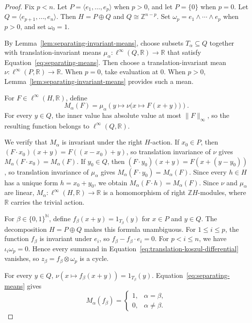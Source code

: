 \documentclass[pdflatex,sn-mathphys-num]{sn-jnl}%
\theoremstyle{plain}
\theoremstyle{remark}
\theoremstyle{definition}
\numberwithin{equation}{section}
\begin{document}
\begin{proof}
Fix \( p<n \). Let \( P=\langle e_1,\ldots,e_p\rangle \) when \( p>0 \), and let \( P=\{0\} \) when \( p=0 \). Let \( Q=\langle e_{p+1},\ldots,e_n\rangle \). Then \( H=P\oplus Q \) and \( Q\cong\mathbb Z^{n-p} \). Set \( \omega_p=e_1\wedge\cdots\wedge e_p \) when \( p>0 \), and set \( \omega_0=1 \).

By Lemma~\ref{lem:separating-invariant-means}, choose subsets \( T_\alpha\subseteq Q \) together with translation-invariant means \( \mu_\alpha\colon\ell^\infty(Q,\mathbb R)\to\mathbb R \) that satisfy Equation~\eqref{eq:separating-means}. Then choose a translation-invariant mean \( \nu\colon\ell^\infty(P,\mathbb R)\to\mathbb R \). When \( p=0 \), take evaluation at \( 0 \). When \( p>0 \), Lemma~\ref{lem:separating-invariant-means} provides such a mean.

For \( F\in\ell^\infty(H,\mathbb R) \), define
\[
M_\alpha(F)
=
\mu_\alpha\left(
y
\longmapsto
\nu\bigl(
x\longmapsto F(x+y)
\bigr)
\right).
\]
For every \( y\in Q \), the inner value has absolute value at most \( \|F\|_\infty \), so the resulting function belongs to \( \ell^\infty(Q,\mathbb R) \).

We verify that \( M_\alpha \) is invariant under the right \( H \)-action. If \( x_0\in P \), then \( (F\cdot x_0)(x+y)=F((x-x_0)+y) \), so translation invariance of \( \nu \) gives \( M_\alpha(F\cdot x_0)=M_\alpha(F) \). If \( y_0\in Q \), then \( (F\cdot y_0)(x+y)=F(x+(y-y_0)) \), so translation invariance of \( \mu_\alpha \) gives \( M_\alpha(F\cdot y_0)=M_\alpha(F) \). Since every \( h\in H \) has a unique form \( h=x_0+y_0 \), we obtain \( M_\alpha(F\cdot h)=M_\alpha(F) \). Since \( \nu \) and \( \mu_\alpha \) are linear, \( M_\alpha\colon\ell^\infty(H,\mathbb R)\to\mathbb R \) is a homomorphism of right \( \mathbb ZH \)-modules, where \( \mathbb R \) carries the trivial action.

For \( \beta\in\{0,1\}^{\mathbb N} \), define \( f_\beta(x+y)=1_{T_\beta}(y) \) for \( x\in P \) and \( y\in Q \). The decomposition \( H=P\oplus Q \) makes this formula unambiguous. For \( 1\leq i\leq p \), the function \( f_\beta \) is invariant under \( e_i \), so \( f_\beta-f_\beta\cdot e_i=0 \). For \( p<i\leq n \), we have \( \iota_i\omega_p=0 \). Hence every summand in Equation~\eqref{eq:translation-koszul-differential} vanishes, so \( z_\beta=f_\beta\otimes\omega_p \) is a cycle.

For every \( y\in Q \), \( \nu(x\mapsto f_\beta(x+y))=1_{T_\beta}(y) \). Equation~\eqref{eq:separating-means} gives
\[
M_\alpha(f_\beta)
=
\begin{cases}
1,
& \alpha=\beta,\\
0,
& \alpha\neq\beta.
\end{cases}
\]


\end{proof}
\end{document}
